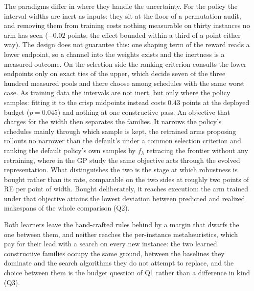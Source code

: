 \documentclass[preprint,12pt]{elsarticle}
\theoremstyle{definition}
\theoremstyle{remark}
\begin{document}
The paradigms differ in where they handle the uncertainty. For the
policy the interval widths are inert as inputs: they sit at the floor
of a permutation audit, and removing them from training costs nothing
measurable on thirty instances no arm has seen ($-0.02$ points, the
effect bounded within a third of a point either way). The design
does not guarantee this: one shaping term of the reward reads a
lower endpoint, so a channel into the weights exists and the
inertness is a measured outcome. On the selection side the ranking
criterion consults the lower endpoints only on exact ties of the
upper, which decide seven of the three hundred measured pools and
there choose among schedules with the same worst case. As training
data the intervals are not inert, but only where the policy samples:
fitting it to the crisp midpoints instead costs $0.43$ points at the
deployed budget ($p=0.045$) and nothing at one constructive pass. An
objective that charges for the width then separates the families. It
narrows the policy's schedules mainly through which sample is kept,
the retrained arms proposing rollouts no narrower than the default's
under a common selection criterion and ranking the default policy's
own samples by $f_\lambda$ retracing the frontier without any
retraining, where in the GP study the same objective acts through the
evolved representation. What distinguishes the two is the stage at which
robustness is bought rather than its rate, comparable on the two
sides at roughly two points of RE per point of width. Bought
deliberately, it reaches execution: the arm trained under that
objective attains the lowest deviation between predicted and realized
makespans of the whole comparison (Q2).

Both learners leave the hand-crafted rules behind by a margin that
dwarfs the one between them, and neither reaches the per-instance
metaheuristics, which pay for their lead with a search on every new
instance: the two learned constructive families occupy the same
ground, between the baselines they dominate and the search algorithms
they do not attempt to replace, and the choice between them is the
budget question of Q1 rather than a difference in kind (Q3).
\end{document}
